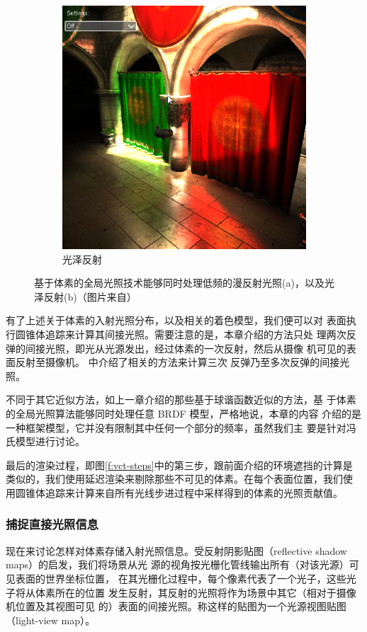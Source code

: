 \begin{figure}
\begin{subfigure}[b]{0.5\textwidth}
		\includegraphics[width=\textwidth]{figures/vct/vct-14-3}
		\caption{光泽反射}
	\end{subfigure}
	\caption{基于体素的全局光照技术能够同时处理低频的漫反射光照(a)，以及光泽反射(b)（图片来自\cite{a:InteractiveIndirectIlluminationUsingVoxelConeTracing}）}
	\label{f:vct-diffuse-vs-specular}
\end{figure}

有了上述关于体素的入射光照分布，以及相关的着色模型，我们便可以对 表面执行圆锥体追踪来计算其间接光照。需要注意的是，本章介绍的方法只处 理两次反弹的间接光照，即光从光源发出，经过体素的一次反射，然后从摄像 机可见的表面反射至摄像机。\cite{a:TheTechnologyofTheTomorrowChildren} 中介绍了相关的方法来计算三次 反弹乃至多次反弹的间接光照。

不同于其它近似方法，如上一章介绍的那些基于球谐函数近似的方法，基 于体素的全局光照算法能够同时处理任意 BRDF 模型，严格地说，本章的内容 介绍的是一种框架模型，它并没有限制其中任何一个部分的频率，虽然我们主 要是针对冯氏模型进行讨论。

最后的渲染过程，即图\ref{f:vct-steps}中的第三步，跟前面介绍的环境遮挡的计算是 类似的，我们使用延迟渲染来剔除那些不可见的体素。在每个表面位置，我们使 用圆锥体追踪来计算来自所有光线步进过程中采样得到的体素的光照贡献值。



\subsubsection{捕捉直接光照信息}
现在来讨论怎样对体素存储入射光照信息。受反射阴影贴图（reflective shadow maps）的启发\cite{a:ReflectiveShadowMaps}，我们将场景从光 源的视角按光栅化管线输出所有（对该光源）可见表面的世界坐标位置， 在其光栅化过程中，每个像素代表了一个光子，这些光子将从体素所在的位置 发生反射，其反射的光照将作为场景中其它（相对于摄像机位置及其视图可见 的）表面的间接光照。称这样的贴图为一个光源视图贴图（light-view map）。

